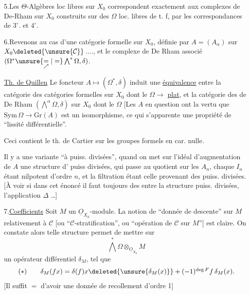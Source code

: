 
5.\quad Les $\Theta$-Algèbres loc libres  sur $X_0$ correspondent exactement aux complexes de De-Rham sur $X_0$ construits sur des $\Omega$ loc. libres de t. f, par les correspondances de $3^\circ$. et $4^\circ$.

6.\quad Revenons au cas d'une catégorie formelle sur $X_0$, définie par $A=(A_\alpha)$ sur $X_0\deleted{\unsure{\mathcal C}}$\,...., et le complexe de De Rham associé $(\Omega^*\unsure{\underset{\nearrow}{=}|=}\bigwedge^*\Omega,\delta)$.

\uline{Th. de Quillen}  Le foncteur $A\longmapsto(\Omega^*,\delta)$ induit une \uline{équivalence} entre la catégorie des catégories formelles  sur $X_0$ dont le $\Omega\to$ \uline{plat}, et la catégorie des  de De Rham $(\bigwedge^\alpha\Omega,\delta)$ sur $X_0$ dont le $\Omega$   [Les $A$ en question ont la vertu que $\mathrm{Sym}\,\Omega\longrightarrow\mathrm{Gr}(A)$ est un isomorphisme, ce qui s'apparente  une propriété de ``lissité différentielle''.

Ceci contient le th. de Cartier sur les groupes formels en car. nulle.

Il y a une variante ``à puiss. divisées'', quand on met sur l'idéal d'augmentation de $A$  une structure d' puiss divisées, qui passe au quotient sur les $A_n$, chaque $I_n$ étant nilpotent d'ordre $n$, et la filtration étant celle provenant des puiss. divisées. [À voir si dans cet énoncé il faut toujours des  entre la structure  puiss. divisées,  l'application $\Delta$ \ldots]


7.\quad \uline{Coefficients}  Soit $M$ un $\underline O_{X_0}$-module. La notion de ``donnée de descente'' sur $M$ relativement à $\mathcal C$ [ou ``$\mathcal C$-stratification'', ou ``opération de $\mathcal C$ sur $M$''] est claire. On constate alors  telle structure permet de mettre sur
\[
\bigwedge^*\Omega\otimes_{\underline O_{X_0}}M
\]
un opérateur différentiel $\delta_M$, tel que
\[
\begin{array}{l@{\qquad}l}
(*)&\delta_M(fx)=\delta(f)x\deleted{\unsure{\delta_M(x)}}+(-1)^{\deg F}f\,\delta_M(x).
\end{array}
\]
[Il suffit $=$ d'avoir une donnée de recollement d'ordre 1]

